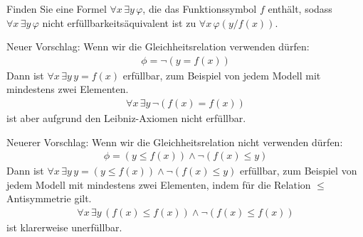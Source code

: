 
\begin{exercise}[176]
Finden Sie eine Formel $\forall x\, \exists y\, \varphi$, die das Funktionssymbol $f$
enthält, sodass $\forall x\, \exists y\, \varphi$ nicht erfüllbarkeitsäquivalent ist zu
$\forall x\, \varphi(y/f(x))$.
\end{exercise}



\begin{solution}
	Neuer Vorschlag: Wenn wir die Gleichheitsrelation verwenden dürfen:
	\begin{align*}
		\phi = \neg(y = f(x))
	\end{align*}
	Dann ist $\forall x\, \exists y\, y = f(x)$ erfüllbar, zum Beispiel von jedem
	Modell mit mindestens zwei Elementen.
	\begin{align*}
		\forall x\, \exists y\, \neg(f(x) = f(x))
	\end{align*}
	ist aber aufgrund den Leibniz-Axiomen nicht erfüllbar.
\end{solution}



\begin{solution}
	Neuerer Vorschlag: Wenn wir die Gleichheitsrelation nicht verwenden dürfen:
	\begin{align*}
		\phi = (y \leq f(x)) \land \neg(f(x) \leq y)
	\end{align*}
	Dann ist $\forall x\, \exists y\, y = (y \leq f(x)) \land \neg(f(x) \leq y)$ erfüllbar,
	zum Beispiel von jedem Modell mit mindestens zwei Elementen, indem für die
	Relation $\leq$ Antisymmetrie gilt.
	\begin{align*}
		\forall x\, \exists y\, (f(x) \leq f(x)) \land \neg(f(x) \leq f(x))
	\end{align*}
	ist klarerweise unerfüllbar.
\end{solution}

